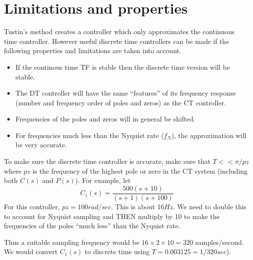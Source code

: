 \section{Limitations and properties}\label{Limitations}
 Tustin's method creates a controller which only approximates the continuous time controller. However useful discrete time controllers can be made if the following properties and limitations are taken into account.	%

\begin{itemize}
  \item If the continous time TF is stable then the discrete time version will be stable.
  \item The DT controller will have the same ``features''  of its frequency response (number and frequency order of poles and zeros) as the CT controller.
  \item Frequencies of the poles and zeros will in general be shifted.
  \item For frequencies much less than the Nyquist rate ($f_N$), the approximation will be very accurate.
\end{itemize}


To make sure the discrete time controller is accurate, make sure that $T<<\pi/pz$ where $pz$ is the frequency of the highest pole or zero in the CT system (including both $C(s)$ and $P(s)$).   For example, let
\[
C_1(s) = \frac{500(s+10)}{(s+1)(s+100)}
\]
For this controller, $pz = 100rad/sec$.   This is about 16$Hz$.
We need to double this to account for Nyquist sampling and THEN multiply by 10 to make the frequencies of the poles ``much less'' than the Nyquist rate.

Thus a suitable sampling frequency would be $16\times2\times10 = 320$ samples/second.  We would convert $C_1(s)$ to discrete time using $T=0.003125 = 1/320 sec$).




